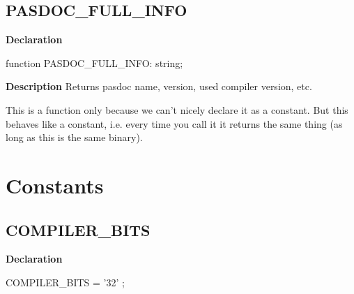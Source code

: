 \documentclass{report}
\newif\ifpdf
\begin{document}
\subsection*{PASDOC{\_}FULL{\_}INFO}
\fi
\label{PasDoc_Versions-PASDOC_FULL_INFO}
\begin{list}{}{
\setlength{\itemindent}{0cm}
\setlength{\listparindent}{0cm}
\setlength{\leftmargin}{\evensidemargin}
\addtolength{\leftmargin}{\tmplength}
\settowidth{\labelsep}{X}
\addtolength{\leftmargin}{\labelsep}
\setlength{\labelwidth}{\tmplength}
}
\item[\textbf{Declaration}\hfill]
\ifpdf
\begin{flushleft}
\fi
\begin{ttfamily}
function PASDOC{\_}FULL{\_}INFO: string;\end{ttfamily}

\ifpdf
\end{flushleft}
\fi

\par
\item[\textbf{Description}]
Returns pasdoc name, version, used compiler version, etc.

This is a function only because we can't nicely declare it as a constant. But this behaves like a constant, i.e. every time you call it it returns the same thing (as long as this is the same binary).

\end{list}
\section{Constants}
\ifpdf
\subsection*{\large{\textbf{COMPILER{\_}BITS}}\normalsize\hspace{1ex}\hrulefill}
\else
\subsection*{COMPILER{\_}BITS}
\fi
\label{PasDoc_Versions-COMPILER_BITS}
\begin{list}{}{
\setlength{\itemindent}{0cm}
\setlength{\listparindent}{0cm}
\setlength{\leftmargin}{\evensidemargin}
\addtolength{\leftmargin}{\tmplength}
\settowidth{\labelsep}{X}
\addtolength{\leftmargin}{\labelsep}
\setlength{\labelwidth}{\tmplength}
}
\item[\textbf{Declaration}\hfill]
\ifpdf
\begin{flushleft}
\fi
\begin{ttfamily}
COMPILER{\_}BITS =   '32' ;\end{ttfamily}

\ifpdf
\end{flushleft}
\fi

\end{list}
\ifpdf
\end{document}
